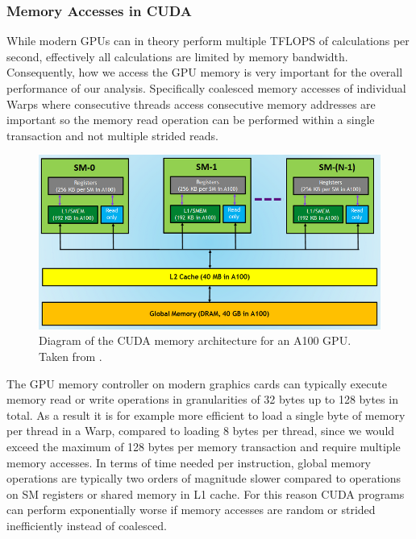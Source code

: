 \subsubsection{Memory Accesses in CUDA}
While modern GPUs can in theory perform multiple TFLOPS of calculations per second, effectively all calculations are limited by memory bandwidth.
Consequently, how we access the GPU memory is very important for the overall performance of our analysis. Specifically coalesced memory accesses of individual Warps where consecutive threads access consecutive memory addresses are important so the memory read operation can be performed within a single transaction and not multiple strided reads.
\begin{figure}
    \centering
    \includegraphics[width=.7\textwidth]{img/cuda.png}
    \caption[Diagram of the CUDA memory architecture for an A100]{Diagram of the CUDA memory architecture for an A100 GPU.\\Taken from \cite{cudarefresher}.}
    \label{fig:cuda-arch}
\end{figure}
The GPU memory controller on modern graphics cards can typically execute memory read or write operations in granularities of 32 bytes up to 128 bytes in total.
As a result it is for example more efficient to load a single byte of memory per thread in a Warp, compared to loading 8 bytes per thread, since we would exceed the maximum of 128 bytes per memory transaction and require multiple memory accesses.
In terms of time needed per instruction, global memory operations are typically two orders of magnitude slower compared to operations on SM registers or shared memory in L1 cache. For this reason CUDA programs can perform exponentially worse if memory accesses are random or strided inefficiently instead of coalesced.

